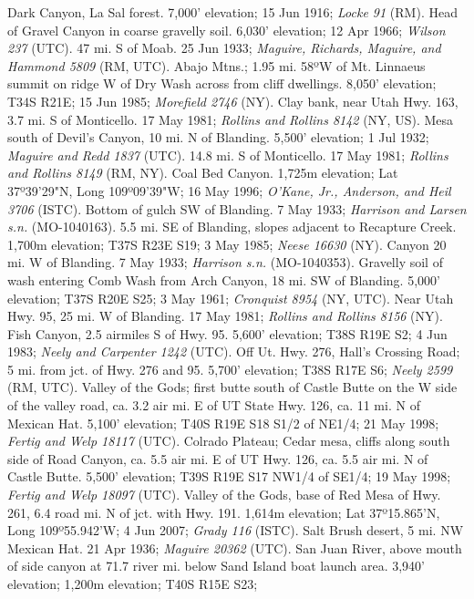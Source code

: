 Dark Canyon, La Sal forest. 7,000' elevation; 15 Jun 1916;
\textit{Locke 91} (RM).
Head of Gravel Canyon in coarse gravelly soil. 6,030' elevation; 12 Apr 1966;
\textit{Wilson 237} (UTC).
47 mi. S of Moab. 25 Jun 1933;
\textit{Maguire, Richards, Maguire, and Hammond 5809} (RM, UTC).
Abajo Mtns.; 1.95 mi. 58ºW of Mt. Linnaeus summit on ridge W of Dry Wash across
from cliff dwellings. 8,050' elevation; T34S R21E; 15 Jun 1985;
\textit{Morefield 2746} (NY).
Clay bank, near Utah Hwy. 163, 3.7 mi. S of Monticello. 17 May 1981;
\textit{Rollins and Rollins 8142} (NY, US).
Mesa south of Devil's Canyon, 10 mi. N of Blanding. 5,500' elevation;
1 Jul 1932; \textit{Maguire and Redd 1837} (UTC).
14.8 mi. S of Monticello. 17 May 1981; \textit{Rollins and Rollins 8149} (RM, NY).
Coal Bed Canyon. 1,725m elevation; Lat 37º39'29"N, Long 109º09'39"W; 16 May 1996;
\textit{O'Kane, Jr., Anderson, and Heil 3706} (ISTC).
Bottom of gulch SW of Blanding. 7 May 1933;
\textit{Harrison and Larsen s.n.} (MO-1040163).
5.5 mi. SE of Blanding, slopes adjacent to Recapture Creek. 1,700m elevation;
T37S R23E S19; 3 May 1985; \textit{Neese 16630} (NY).
Canyon 20 mi. W of Blanding. 7 May 1933; \textit{Harrison s.n.} (MO-1040353).
Gravelly soil of wash entering Comb Wash from Arch Canyon, 18 mi. SW of Blanding.
5,000' elevation; T37S R20E S25; 3 May 1961; \textit{Cronquist 8954} (NY, UTC).
Near Utah Hwy. 95, 25 mi. W of Blanding. 17 May 1981;
\textit{Rollins and Rollins 8156} (NY).
Fish Canyon, 2.5 airmiles S of Hwy. 95. 5,600' elevation; T38S R19E S2;
4 Jun 1983; \textit{Neely and Carpenter 1242} (UTC).
Off Ut. Hwy. 276, Hall's Crossing Road; 5 mi. from jct. of Hwy. 276 and 95.
5,700' elevation; T38S R17E S6; \textit{Neely 2599} (RM, UTC).
Valley of the Gods; first butte south of Castle Butte on the W side of the
valley road, ca. 3.2 air mi. E of UT State Hwy. 126, ca. 11 mi. N of Mexican Hat.
5,100' elevation; T40S R19E S18 S1/2 of NE1/4; 21 May 1998;
\textit{Fertig and Welp 18117} (UTC).
Colrado Plateau; Cedar mesa, cliffs along south side of Road Canyon, ca. 5.5 air
mi. E of UT Hwy. 126, ca. 5.5 air mi. N of Castle Butte. 5,500' elevation;
T39S R19E S17 NW1/4 of SE1/4; 19 May 1998; \textit{Fertig and Welp 18097} (UTC).
Valley of the Gods, base of Red Mesa of Hwy. 261, 6.4 road mi. N of jct. with
Hwy. 191. 1,614m elevation; Lat 37º15.865'N, Long 109º55.942'W; 4 Jun 2007;
\textit{Grady 116} (ISTC).
Salt Brush desert, 5 mi. NW Mexican Hat. 21 Apr 1936;
\textit{Maguire 20362} (UTC).
San Juan River, above mouth of side canyon at 71.7 river mi. below Sand Island
boat launch area. 3,940' elevation; 1,200m elevation; T40S R15E S23;
